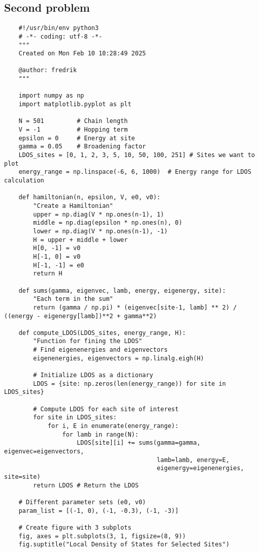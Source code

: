 \subsection{Second problem}
\begin{verbatim}
    #!/usr/bin/env python3
    # -*- coding: utf-8 -*-
    """
    Created on Mon Feb 10 10:28:49 2025
    
    @author: fredrik
    """
    
    import numpy as np
    import matplotlib.pyplot as plt
    
    N = 501         # Chain length
    V = -1          # Hopping term
    epsilon = 0     # Energy at site
    gamma = 0.05    # Broadening factor
    LDOS_sites = [0, 1, 2, 3, 5, 10, 50, 100, 251] # Sites we want to plot
    energy_range = np.linspace(-6, 6, 1000)  # Energy range for LDOS calculation
    
    def hamiltonian(n, epsilon, V, e0, v0):
        "Create a Hamiltonian"
        upper = np.diag(V * np.ones(n-1), 1)
        middle = np.diag(epsilon * np.ones(n), 0)
        lower = np.diag(V * np.ones(n-1), -1)
        H = upper + middle + lower
        H[0, -1] = v0
        H[-1, 0] = v0
        H[-1, -1] = e0
        return H
    
    def sums(gamma, eigenvec, lamb, energy, eigenergy, site):
        "Each term in the sum"
        return (gamma / np.pi) * (eigenvec[site-1, lamb] ** 2) / ((energy - eigenergy[lamb])**2 + gamma**2)
    
    def compute_LDOS(LDOS_sites, energy_range, H):
        "Function for fining the LDOS"
        # Find eigenenergies and eigenvectors
        eigenenergies, eigenvectors = np.linalg.eigh(H)
    
        # Initialize LDOS as a dictionary
        LDOS = {site: np.zeros(len(energy_range)) for site in LDOS_sites}
        
        # Compute LDOS for each site of interest
        for site in LDOS_sites:
            for i, E in enumerate(energy_range):
                for lamb in range(N):
                    LDOS[site][i] += sums(gamma=gamma, eigenvec=eigenvectors, 
                                          lamb=lamb, energy=E, 
                                          eigenergy=eigenenergies, site=site)
        return LDOS # Return the LDOS
    
    # Different parameter sets (e0, v0)
    param_list = [(-1, 0), (-1, -0.3), (-1, -3)]
    
    # Create figure with 3 subplots
    fig, axes = plt.subplots(3, 1, figsize=(8, 9))
    fig.suptitle("Local Density of States for Selected Sites")
    

\end{verbatim}
